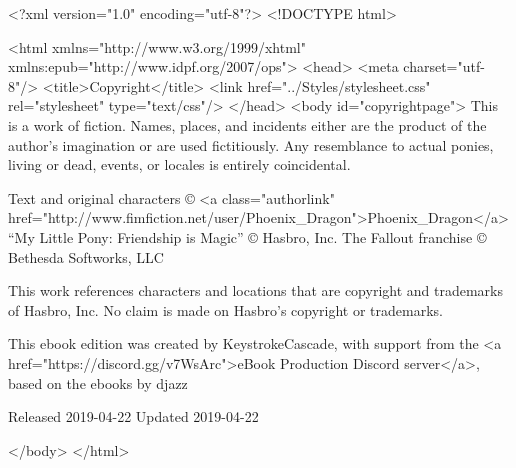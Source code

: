 <?xml version="1.0" encoding="utf-8"?>
<!DOCTYPE html>

<html xmlns="http://www.w3.org/1999/xhtml" xmlns:epub="http://www.idpf.org/2007/ops">
<head>
	<meta charset="utf-8"/>
	<title>Copyright</title>
	<link href="../Styles/stylesheet.css" rel="stylesheet" type="text/css"/>
</head>
<body id="copyrightpage">
	This is a work of fiction. Names, places, and incidents either are the product of the author’s imagination or are used fictitiously. Any resemblance to actual ponies, living or dead, events, or locales is entirely coincidental.


	
		Text and original characters © <a class="authorlink" href="http://www.fimfiction.net/user/Phoenix\_Dragon">Phoenix\_Dragon</a>		“My Little Pony: Friendship is Magic” © Hasbro, Inc.		The Fallout franchise © Bethesda Softworks, LLC
	


	This work references characters and locations that are copyright and trademarks of Hasbro, Inc. No claim is made on Hasbro's copyright or trademarks.


	This ebook edition was created by KeystrokeCascade, with support from the <a href="https://discord.gg/v7WsArc">eBook Production Discord server</a>, based on the ebooks by djazz

	
		Released 2019-04-22		Updated 2019-04-22
	

</body>
</html>